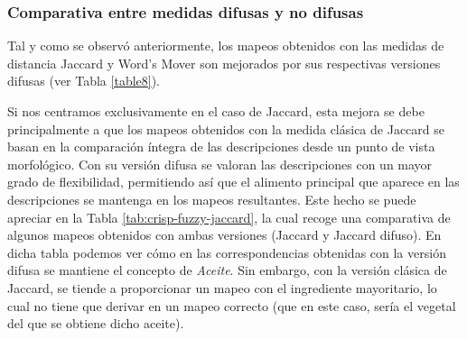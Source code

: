 \subsubsection{Comparativa entre medidas difusas y no difusas}

Tal y como se observó anteriormente, los mapeos obtenidos con las medidas de distancia Jaccard y Word's Mover son mejorados por sus respectivas versiones difusas (ver Tabla \ref{table8}).

Si nos centramos exclusivamente en el caso de Jaccard, esta mejora se debe principalmente a que los mapeos obtenidos con la medida clásica de Jaccard se basan en la comparación íntegra de las descripciones desde un punto de vista morfológico. Con su versión difusa se valoran las descripciones con un mayor grado de flexibilidad, permitiendo así que el alimento principal que aparece en las descripciones se mantenga en los mapeos resultantes. Este hecho se puede apreciar en la Tabla \ref{tab:crisp-fuzzy-jaccard}, la cual recoge una comparativa de algunos mapeos obtenidos con ambas versiones (Jaccard y Jaccard difuso). En dicha tabla podemos ver cómo en las correspondencias obtenidas con la versión difusa se mantiene el concepto de \textit{Aceite}. Sin embargo, con la versión clásica de Jaccard, se tiende a proporcionar un mapeo con el ingrediente mayoritario, lo cual no tiene que derivar en un mapeo correcto (que en este caso, sería el vegetal del que se obtiene dicho aceite).

